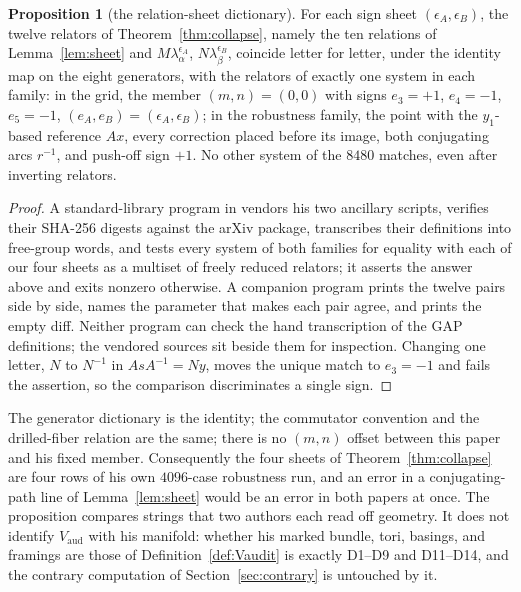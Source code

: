 \documentclass[11pt]{article}
\theoremstyle{definition}
\newtheorem{proposition}[theorem]{Proposition}
\begin{document}
\begin{proposition}[the relation-sheet dictionary]\label{prop:dictionary}
For each sign sheet $(\epsilon_A,\epsilon_B)$, the twelve relators of
Theorem~\ref{thm:collapse}, namely the ten relations of
Lemma~\ref{lem:sheet} and $M\lambda_\alpha^{\epsilon_A}$,
$N\lambda_\beta^{\epsilon_B}$, coincide letter for letter, under the
identity map on the eight generators, with the relators of exactly one
system in each family: in the grid, the member $(m,n)=(0,0)$ with signs
$e_3=+1$, $e_4=-1$, $e_5=-1$, $(e_A,e_B)=(\epsilon_A,\epsilon_B)$; in the
robustness family, the point with the $y_1$-based reference $Ax$, every
correction placed before its image, both conjugating arcs $r^{-1}$, and
push-off sign $+1$.  No other system of the $8480$ matches, even after
inverting relators.
\end{proposition}

\begin{proof}
A standard-library program in
 vendors his two
ancillary scripts, verifies their SHA-256 digests against the arXiv package,
transcribes their definitions into free-group words, and tests every system
of both families for equality with each of our four sheets as a multiset of
freely reduced relators; it asserts the answer above and exits nonzero
otherwise.  A companion program prints the twelve pairs side by side, names
the parameter that makes each pair agree, and prints the empty diff.
Neither program can check the hand transcription of the GAP definitions;
the vendored sources sit beside them for inspection.  Changing one letter,
$N$ to $N^{-1}$ in $AsA^{-1}=Ny$, moves the unique match to $e_3=-1$ and
fails the assertion, so the comparison discriminates a single sign.
\end{proof}

The generator dictionary is the identity; the commutator convention and the
drilled-fiber relation are the same; there is no $(m,n)$ offset between
this paper and his fixed member.  Consequently the four sheets of
Theorem~\ref{thm:collapse} are four rows of his own $4096$-case robustness
run, and an error in a conjugating-path line of Lemma~\ref{lem:sheet} would
be an error in both papers at once.  The proposition compares strings that
two authors each read off geometry.  It does not identify
$V_{\mathrm{aud}}$ with his manifold: whether his marked bundle, tori,
basings, and framings are those of Definition~\ref{def:Vaudit} is exactly
D1--D9 and D11--D14, and the contrary computation of
Section~\ref{sec:contrary} is untouched by it.
\end{document}
